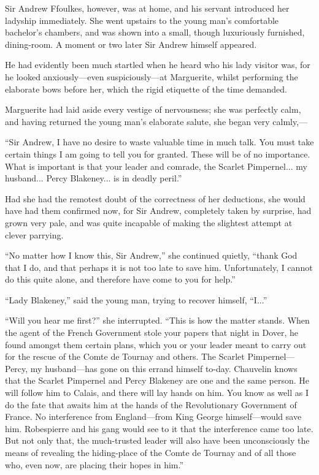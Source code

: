 Sir Andrew Ffoulkes, however, was at home, and his servant introduced her ladyship immediately. She went upstairs to the young man's comfortable bachelor's chambers, and was shown into a small, though luxuriously furnished, dining-room. A moment or two later Sir Andrew himself appeared.

He had evidently been much startled when he heard who his lady visitor was, for he looked anxiously---even suspiciously---at Marguerite, whilst performing the elaborate bows before her, which the rigid etiquette of the time demanded.

Marguerite had laid aside every vestige of nervousness; she was perfectly calm, and having returned the young man's elaborate salute, she began very calmly,---

\enquote{Sir Andrew, I have no desire to waste valuable time in much talk. You must take certain things I am going to tell you for granted. These will be of no importance. What is important is that your leader and comrade, the Scarlet Pimpernel... my husband... Percy Blakeney... is in deadly peril.}

Had she had the remotest doubt of the correctness of her deductions, she would have had them confirmed now, for Sir Andrew, completely taken by surprise, had grown very pale, and was quite incapable of making the slightest attempt at clever parrying.

\enquote{No matter how I know this, Sir Andrew,} she continued quietly, \enquote{thank God that I do, and that perhaps it is not too late to save him. Unfortunately, I cannot do this quite alone, and therefore have come to you for help.}

\enquote{Lady Blakeney,} said the young man, trying to recover himself, \enquote{I...}

\enquote{Will you hear me first?} she interrupted. \enquote{This is how the matter stands. When the agent of the French Government stole your papers that night in Dover, he found amongst them certain plans, which you or your leader meant to carry out for the rescue of the Comte de Tournay and others. The Scarlet Pimpernel---Percy, my husband---has gone on this errand himself to-day. Chauvelin knows that the Scarlet Pimpernel and Percy Blakeney are one and the same person. He will follow him to Calais, and there will lay hands on him. You know as well as I do the fate that awaits him at the hands of the Revolutionary Government of France. No interference from England---from King George himself---would save him. Robespierre and his gang would see to it that the interference came too late. But not only that, the much-trusted leader will also have been unconsciously the means of revealing the hiding-place of the Comte de Tournay and of all those who, even now, are placing their hopes in him.}

